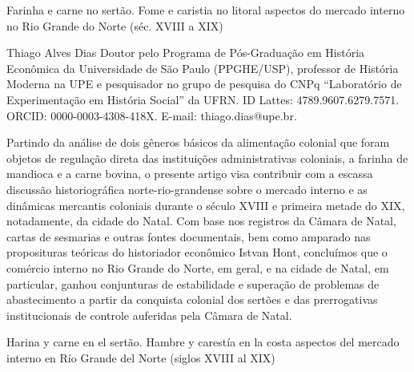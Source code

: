 \begin{refsection}
\renewcommand{\thefigure}{\arabic{figure}}

\chapterTwoLines
{Farinha e carne no sertão. Fome e caristia no litoral}
{aspectos do mercado interno no Rio Grande do Norte (séc. XVIII a XIX)}
\label{chap:farinha}

\articleAuthor
{Thiago Alves Dias}
{Doutor pelo Programa de Pós-Graduação em História Econômica da Universidade de São Paulo (PPGHE/USP), professor de História Moderna na UPE e pesquisador no grupo de pesquisa do CNPq ``Laboratório de Experimentação em História Social'' da UFRN. ID Lattes: 4789.9607.6279.7571. ORCID: 0000-0003-4308-418X. E-mail: thiago.dias@upe.br.}

\begin{galoResumo}
    Partindo da análise de dois gêneros básicos da alimentação colonial que foram objetos de regulação direta das instituições administrativas coloniais, a farinha de mandioca e a carne bovina, o presente artigo visa contribuir com a escassa discussão historiográfica norte-rio-grandense sobre o mercado interno e as dinâmicas mercantis coloniais durante o século XVIII e primeira metade do XIX, notadamente, da cidade do Natal. Com base nos registros da Câmara de Natal, cartas de sesmarias e outras fontes documentais, bem como amparado nas proposituras teóricas do historiador econômico Istvan Hont, concluímos que o comércio interno no Rio Grande do Norte, em geral, e na cidade de Natal, em particular, ganhou conjunturas de estabilidade e superação de problemas de abastecimento a partir da conquista colonial dos sertões e das prerrogativas institucionais de controle auferidas pela Câmara de Natal.
\end{galoResumo}


\begin{otherlanguage}{spanish}

    \fakeChapterTwoLines
    {Harina y carne en el sertão. Hambre y carestía en la costa}
    {aspectos del mercado interno en Río Grande del Norte (siglos XVIII al XIX)}
    

\end{otherlanguage}
\end{refsection}
